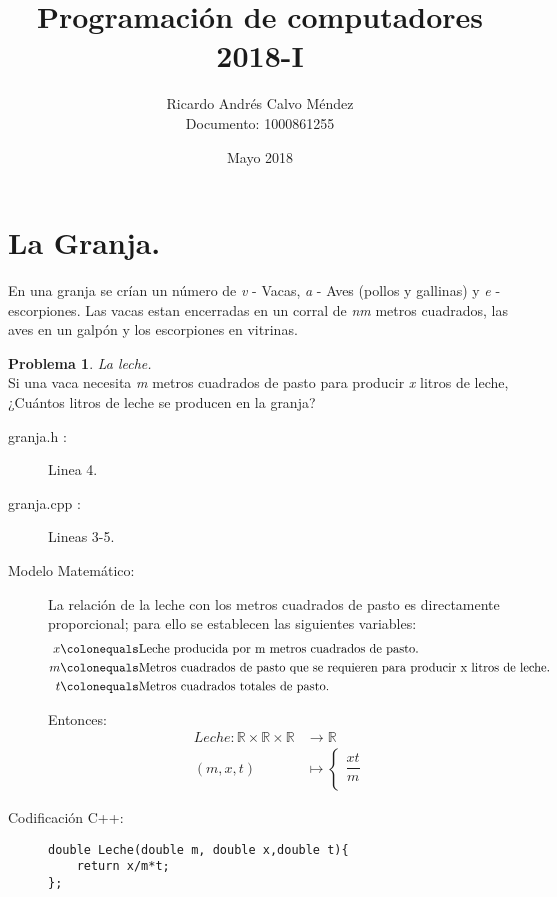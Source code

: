 \documentclass{article}
\title{Programación de computadores 2018-I}
\author{Ricardo Andrés Calvo Méndez\\Documento: 1000861255}
\date{Mayo 2018}
\theoremstyle{plain}
\theoremstyle{definition}
\newtheorem{problem}{Problema}
\begin{document}
\maketitle

\section{La Granja.}
En una granja se crían un número de \emph{v} - Vacas, \emph{a} - Aves (pollos y gallinas) y \emph{e} - escorpiones. Las vacas estan encerradas en un corral de \emph{n}\emph{m} metros cuadrados, las aves en un galpón y los escorpiones en vitrinas.

\begin{problem} \emph{La leche.}\\
\hspace*{7mm}Si una vaca necesita \emph{m} metros cuadrados de pasto para producir \emph{x} litros de leche, ¿Cuántos litros de leche se producen en la granja?
\begin{description}
\item[granja.h :] Linea 4. \item[granja.cpp :] Lineas 3-5.

\item[Modelo Matemático:]
%
La relación de la leche con los metros cuadrados de pasto es directamente proporcional; para ello se establecen las siguientes variables:
\begin{align*}
x &\colonequals \text{Leche producida por m metros cuadrados de pasto.}\\
m &\colonequals \text{Metros cuadrados de pasto que se requieren para producir x litros de leche.}\\
t &\colonequals \text{Metros cuadrados totales de pasto.}
\end{align*}

Entonces:
\begin{align*}
Leche: \mathbb{R} \times\mathbb{R}\times\mathbb{R}&\to \mathbb{R}\\
(m,x,t) &\mapsto \begin{cases}
\dfrac{xt}{m}\\
\end{cases}
\end{align*}
%
\item[Codificación \textsf{C++}:]\hfill
%
\begin{verbatim}
double Leche(double m, double x,double t){
    return x/m*t;
};

\end{verbatim}
\end{description}
\end{problem}
\end{document}
